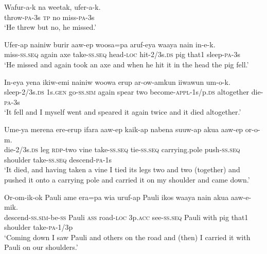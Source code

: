\ea
\gll  Wafur-a-k  na  weetak,  ufer-a-k. \\
throw-\textsc{pa}-3s  \textsc{tp}  no  miss-\textsc{pa}-3s \\
\glt ‘He threw but no, he missed.’ \\
\z


\ea
\gll  Ufer-ap  nainiw  burir  aaw-ep  woosa=pa  aruf-eya      waaya  nain  in-e-k. \\
miss-\textsc{ss.seq}  again  axe  take-\textsc{ss.seq}  head-\textsc{loc}  hit-2/3s.\textsc{ds}   pig  that1  sleep-\textsc{pa}-3s \\


\glt ‘He missed and again took an axe and when he hit it in the head the pig fell.’ \\
\z


\ea
\gll  In-eya  yena  ikiw-emi  nainiw  woowa  erup  ar-ow-amkun           iiwawun  um-o-k. \\
sleep-2/3s.\textsc{ds}  1s.\textsc{gen}  go-\textsc{ss}.\textsc{sim}  again  spear  two  become-\textsc{appl}-1s/p.\textsc{ds} altogether  die-\textsc{pa}-3s \\


\glt ‘It fell and I myself went and speared it again twice and it died altogether.’ \\
\z


\ea
\gll  Ume-ya  merena  ere-erup  ifara  aaw-ep  kaik-ap  nabena            suuw-ap  akua  aaw-ep  or-o-m. \\
die-2/3s.\textsc{ds}  leg  \textsc{rdp}-two  vine  take-\textsc{ss.seq}  tie-\textsc{ss.seq}  carrying.pole   push-\textsc{ss.seq}  shoulder  take-\textsc{ss.seq}  descend-\textsc{pa}-1s \\


\glt ‘It died, and having taken a vine I tied its legs two and two (together) and pushed it onto a carrying pole and carried it on my shoulder and came down.’ \\
\z


\ea
\gll  Or-om-ik-ok  Pauli  ame  era=pa  wia  uruf-ap  Pauli  ikos             waaya  nain  akua  aaw-e-mik. \\
descend-\textsc{ss}.\textsc{sim}-be-\textsc{ss}  Pauli  \textsc{ass}  road-\textsc{loc}  3p.\textsc{acc}  see-\textsc{ss.seq}  Pauli  with  pig  that1  shoulder  take-\textsc{pa}-1/3p \\


\glt ‘Coming down I saw Pauli and others on the road and (then) I carried it with Pauli on our shoulders.’ \\
\z


